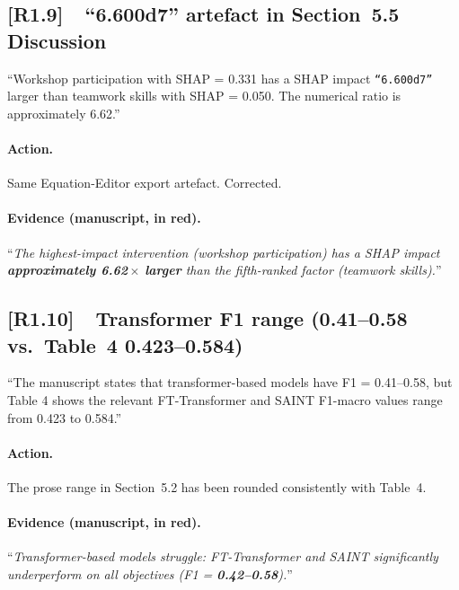 \documentclass[11pt,a4paper]{article}
\newcommand{\cid}[1]{\textcolor{revred}{\textbf{[#1]}}}
\newcommand{\sectref}[1]{Section~#1}
\newcommand{\stress}[1]{\textbf{#1}}
\begin{document}
\begin{itemize}
\subsection*{\cid{R1.9}~~``6.600d7'' artefact in \sectref{5.5} Discussion}

\begin{reviewerquote}
``Workshop participation with SHAP = 0.331 has a SHAP impact \texttt{``6.600d7''} larger than teamwork skills with SHAP = 0.050. The numerical ratio is approximately 6.62.''
\end{reviewerquote}

\paragraph{Action.} Same Equation-Editor export artefact. Corrected.

\paragraph{Evidence (manuscript, in red).} ``\textit{The highest-impact intervention (workshop participation) has a SHAP impact \stress{approximately 6.62\,$\times$ larger} than the fifth-ranked factor (teamwork skills).}''

\subsection*{\cid{R1.10}~~Transformer F1 range (0.41--0.58 vs.\ Table~4 0.423--0.584)}

\begin{reviewerquote}
``The manuscript states that transformer-based models have F1 = 0.41--0.58, but Table 4 shows the relevant FT-Transformer and SAINT F1-macro values range from 0.423 to 0.584.''
\end{reviewerquote}

\paragraph{Action.} The prose range in \sectref{5.2} has been rounded consistently with Table~4.

\paragraph{Evidence (manuscript, in red).} ``\textit{Transformer-based models struggle: FT-Transformer and SAINT significantly underperform on all objectives (F1 = \stress{0.42--0.58}).}''


\end{itemize}
\end{document}
